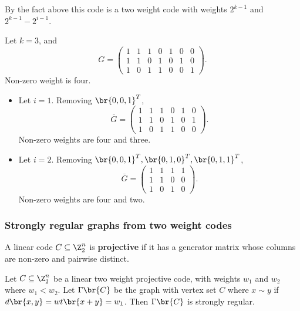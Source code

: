 By the fact above this code is a two weight code with weights $ 2^{k - 1} $ and $ 2^{k - 1} - 2^{i - 1} $.

\begin{example*}
Let $ k = 3 $, and
$$ G =
\begin{pmatrix}
1 & 1 & 1 & 0 & 1 & 0 & 0 \\
1 & 1 & 0 & 1 & 0 & 1 & 0 \\
1 & 0 & 1 & 1 & 0 & 0 & 1
\end{pmatrix}.
$$
Non-zero weight is four.
\begin{itemize}
\item Let $ i = 1 $. Removing $ \br{0, 0, 1}^T $,
$$ \overline{G} =
\begin{pmatrix}
1 & 1 & 1 & 0 & 1 & 0 \\
1 & 1 & 0 & 1 & 0 & 1 \\
1 & 0 & 1 & 1 & 0 & 0
\end{pmatrix}.
$$
Non-zero weights are four and three.
\item Let $ i = 2 $. Removing $ \br{0, 0, 1}^T, \br{0, 1, 0}^T, \br{0, 1, 1}^T $,
$$ \overline{G} =
\begin{pmatrix}
1 & 1 & 1 & 1 \\
1 & 1 & 0 & 0 \\
1 & 0 & 1 & 0
\end{pmatrix}.
$$
Non-zero weights are four and two.
\end{itemize}
\end{example*}

\pagebreak

\subsubsection{Strongly regular graphs from two weight codes}

\begin{definition*}
A linear code $ C \subseteq \Z_2^n $ is \textbf{projective} if it has a generator matrix whose columns are non-zero and pairwise distinct.
\end{definition*}

\begin{theorem}[Delsarte]
\label{thm:2.11}
Let $ C \subseteq \Z_2^n $ be a linear two weight projective code, with weights $ w_1 $ and $ w_2 $ where $ w_1 < w_2 $. Let $ \Gamma\br{C} $ be the graph with vertex set $ C $ where $ x \sim y $ if $ d\br{x, y} = wt\br{x + y} = w_1 $. Then $ \Gamma\br{C} $ is strongly regular.
\end{theorem}

